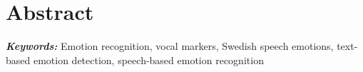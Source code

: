 \newpage
\chapter*{Abstract}
{}



\vspace{0.6cm}
{

{\parindent=0cm\Large\textit{\textbf{Keywords:}}}
Emotion recognition, vocal markers, Swedish speech emotions, text-based emotion detection, speech-based emotion recognition 

\vspace{0.3cm}


}